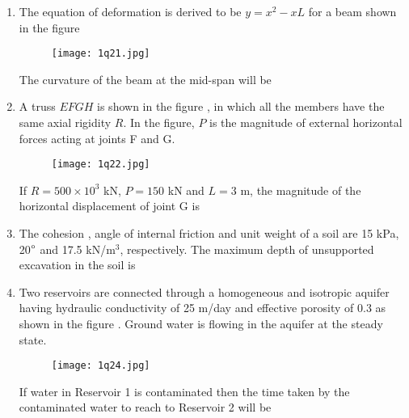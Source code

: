 \documentclass[journal,12pt,onecolumn]{article}
\theoremstyle{remark}
\begin{document}
\begin{enumerate}
\hfill{}

\item The equation of deformation is derived to be $y = x^2-xL$ for a beam shown in the figure 
\begin{figure}[H]
    \centering
    \texttt{[image: 1q21.jpg]}
    \caption{}
    \label{fig:q21}
\end{figure}
The curvature of the beam at the mid-span  will be \underline{\hspace{2cm}}

\hfill{}

\item A truss $EFGH$ is shown in the figure , in which all the members have the same axial rigidity $R$. In the figure, $P$ is the magnitude of external horizontal forces acting at joints F and G.
\begin{figure}[H]
    \centering
    \texttt{[image: 1q22.jpg]}
    \caption{}
    \label{fig:q22}
\end{figure}
If $R = 500 \times 10^3$ kN, $P = 150$ kN and $L = 3$ m, the magnitude of the horizontal displacement of joint G  is \underline{\hspace{2cm}}

\hfill{}

\item The cohesion , angle of internal friction \brak{\phi} and unit weight \brak{\gamma} of a soil are 15 kPa, 20$\degree$ and 17.5 kN/m$^3$, respectively. The maximum depth of unsupported excavation in the soil  is \underline{\hspace{2cm}}

\hfill{}

\item Two reservoirs are connected through a homogeneous and isotropic aquifer having hydraulic conductivity  of 25 m/day and effective porosity \brak{\eta} of $0.3$ as shown in the figure   . Ground water is flowing in the aquifer at the steady state.
\begin{figure}[H]
    \centering
    \texttt{[image: 1q24.jpg]}
    \caption{}
    \label{fig:q24}
\end{figure}
If water in Reservoir 1 is contaminated then the time  taken by the contaminated water to reach to Reservoir 2 will be \underline{\hspace{2cm}}
\hfill{}


\end{enumerate}
\end{document}
